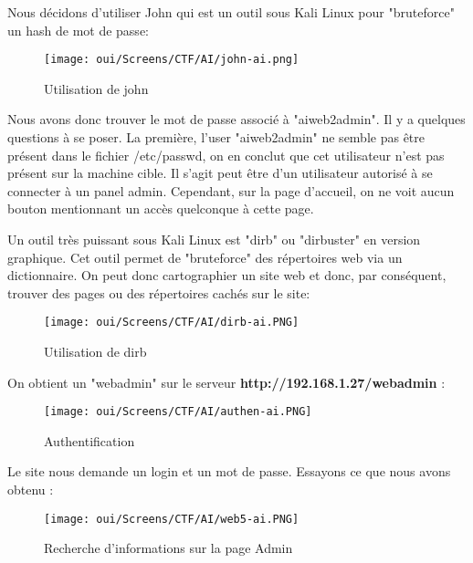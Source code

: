 \noindent Nous décidons d'utiliser John qui est un outil sous Kali Linux pour "bruteforce" un hash de mot de passe:

\begin{figure}[htp!]
  \centering
  \setlength\figureheight{7cm}
  \setlength\figurewidth{9cm}
  \texttt{[image: oui/Screens/CTF/AI/john-ai.png]}
  \caption{Utilisation de john}
  \label{fig:courbe-tikz}
\end{figure}

\noindent Nous avons donc trouver le mot de passe associé à "aiweb2admin". Il y a quelques questions à se poser. La première, l'user "aiweb2admin" ne semble pas être présent dans le fichier /etc/passwd, on en conclut que cet utilisateur n'est pas présent sur la machine cible. Il s'agit peut être d'un utilisateur autorisé à se connecter à un panel admin. Cependant, sur la page d'accueil, on ne voit aucun bouton mentionnant un accès quelconque à cette page.

\noindent Un outil très puissant sous Kali Linux est "dirb" ou "dirbuster" en version graphique. Cet outil permet de "bruteforce" des répertoires web via un dictionnaire. On peut donc cartographier un site web et donc, par conséquent, trouver des pages ou des répertoires cachés sur le site:

\begin{figure}[htp!]
  \centering
  \setlength\figureheight{7cm}
  \setlength\figurewidth{9cm}
  \texttt{[image: oui/Screens/CTF/AI/dirb-ai.PNG]}
  \caption{Utilisation de dirb}
  \label{fig:courbe-tikz}
\end{figure}

\noindent On obtient un "webadmin" sur le serveur \textbf{http://192.168.1.27/webadmin} :

\begin{figure}[htp!]
  \centering
  \setlength\figureheight{7cm}
  \setlength\figurewidth{9cm}
  \texttt{[image: oui/Screens/CTF/AI/authen-ai.PNG]}
  \caption{Authentification}
  \label{fig:courbe-tikz}
\end{figure}

\noindent Le site nous demande un login et un mot de passe. Essayons ce que nous avons obtenu :

\begin{figure}[htp!]
  \centering
  \setlength\figureheight{7cm}
  \setlength\figurewidth{9cm}
  \texttt{[image: oui/Screens/CTF/AI/web5-ai.PNG]}
  \caption{Recherche d'informations sur la page Admin}
  \label{fig:courbe-tikz}
\end{figure}

